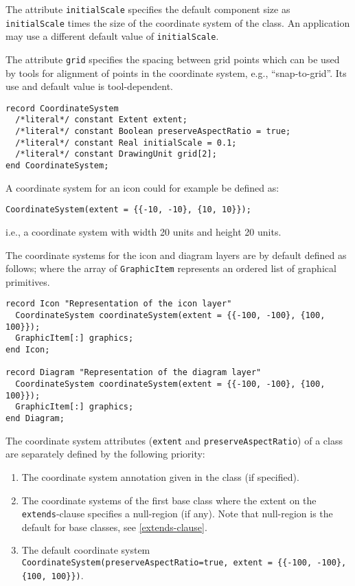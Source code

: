The attribute \lstinline!initialScale! specifies the default component size as \lstinline!initialScale! times the size of the coordinate system of the class.
An application may use a different default value of \lstinline!initialScale!.

The attribute \lstinline!grid! specifies the spacing between grid points which can be used by tools for alignment of points in the coordinate system, e.g., ``snap-to-grid''.
Its use and default value is tool-dependent.

\begin{lstlisting}[language=modelica]
record CoordinateSystem
  /*literal*/ constant Extent extent;
  /*literal*/ constant Boolean preserveAspectRatio = true;
  /*literal*/ constant Real initialScale = 0.1;
  /*literal*/ constant DrawingUnit grid[2];
end CoordinateSystem;
\end{lstlisting}

\begin{example}
A coordinate system for an icon could for example be defined as:
\begin{lstlisting}[language=modelica]
CoordinateSystem(extent = {{-10, -10}, {10, 10}});
\end{lstlisting}
i.e., a coordinate system with width 20 units and height 20 units.
\end{example}

The coordinate systems for the icon and diagram layers are by default defined as follows; where the array of \lstinline!GraphicItem! represents an ordered list of graphical primitives.

\begin{lstlisting}[language=modelica]
record Icon "Representation of the icon layer"
  CoordinateSystem coordinateSystem(extent = {{-100, -100}, {100, 100}});
  GraphicItem[:] graphics;
end Icon;

record Diagram "Representation of the diagram layer"
  CoordinateSystem coordinateSystem(extent = {{-100, -100}, {100, 100}});
  GraphicItem[:] graphics;
end Diagram;
\end{lstlisting}
The coordinate system attributes (\lstinline!extent! and \lstinline!preserveAspectRatio!) of a class are separately defined by the following priority:
\begin{enumerate}
\item
  The coordinate system annotation given in the class (if specified).
\item
  The coordinate systems of the first base class where the extent on the \lstinline!extends!-clause specifies a null-region (if any).
  Note that null-region is the default for base classes, see \cref{extends-clause}.
\item
  The default coordinate system \lstinline!CoordinateSystem(preserveAspectRatio=true, extent = {{-100, -100}, {100, 100}})!.
\end{enumerate}

